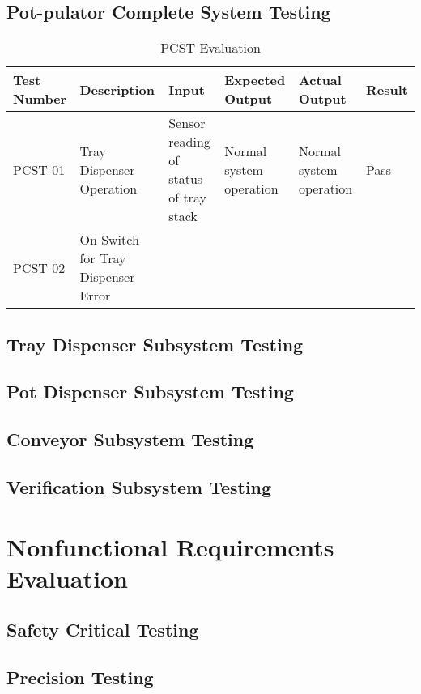\documentclass[12pt, titlepage]{article}
\begin{document}
\subsection{Pot-pulator Complete System Testing}

\begin{table}[h]
  \centering
  \begin{tabularx}{\textwidth}{|X|X|X|X|X|p{1cm}|}
    \hline
    Test Number & Description & Input & Expected Output & Actual Output & Result\\
    \hline
    PCST-01 & Tray Dispenser Operation & Sensor reading of status of tray stack & Normal system operation & Normal system operation & Pass \\
    \hline
    PCST-02 & On Switch for Tray Dispenser Error
  \end{tabularx}
  \caption{PCST Evaluation}
  \label{tab:PCST}
\end{table}

\subsection{Tray Dispenser Subsystem Testing}

\subsection{Pot Dispenser Subsystem Testing}

\subsection{Conveyor Subsystem Testing}

\subsection{Verification Subsystem Testing}

\section{Nonfunctional Requirements Evaluation}

\subsection{Safety Critical Testing}
		
\subsection{Precision Testing}
\end{document}

